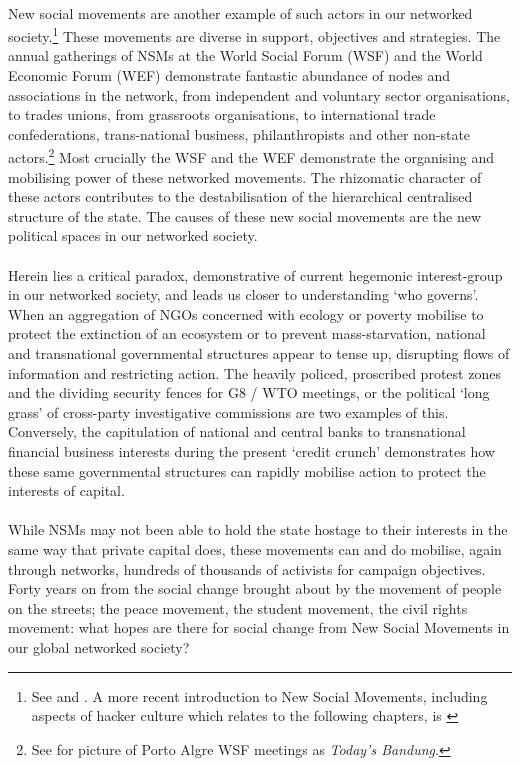 \paragraph{}New social movements are another example of such actors in our networked society.\footnote{See \cite{Dalton:1990zr} and \cite{Eder:1993fj}. A more recent introduction to New Social Movements, including aspects of hacker culture which relates to the following chapters, is \cite{Porta:2006kx}} These movements are diverse in support, objectives and strategies. The annual gatherings of NSMs at the World Social Forum (WSF) and the World Economic Forum (WEF) demonstrate fantastic abundance of nodes and associations in the network, from independent and voluntary sector organisations, to trades unions, from grassroots organisations, to international trade confederations, trans-national business, philanthropists and other non-state actors.\footnote{See \cite{Hardt:2002} for picture of Porto Algre WSF meetings as \textit{Today's Bandung}.} Most crucially the WSF and the WEF demonstrate the organising and mobilising power of these networked movements. The rhizomatic character of these actors contributes to the destabilisation of the hierarchical centralised structure of the state. The causes of these new social movements are the new political spaces in our networked society.

\paragraph{}Herein lies a critical paradox, demonstrative of current hegemonic interest-group in our networked society, and leads us closer to understanding `who governs'. When an aggregation of NGOs concerned with ecology or poverty mobilise to protect the extinction of an ecosystem or to prevent mass-starvation, national and transnational governmental structures appear to tense up, disrupting flows of information and restricting action. The heavily policed, proscribed protest zones and the dividing security fences for G8 / WTO meetings, or the political `long grass' of cross-party investigative commissions are two examples of this. Conversely, the capitulation of national and central banks to transnational financial business interests during the present `credit crunch' demonstrates how these same governmental structures can rapidly mobilise action to protect the interests of capital.

\paragraph{}While NSMs may not been able to hold the state hostage to their interests in the same way that private capital does, these movements can and do mobilise, again through networks, hundreds of thousands of activists for campaign objectives. Forty years on from the social change brought about by the movement of people on the streets; the peace movement, the student movement, the civil rights movement: what hopes are there for social change from New Social Movements in our global networked society?


